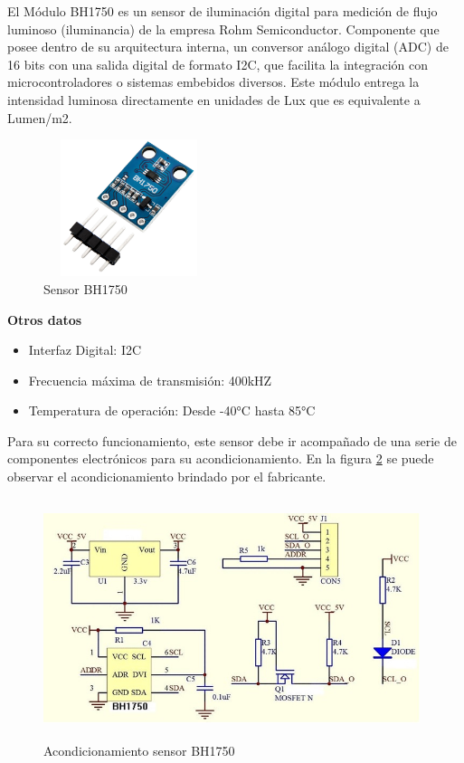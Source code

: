 El Módulo BH1750 es un sensor de iluminación digital para medición de flujo luminoso (iluminancia) de la empresa Rohm Semiconductor. Componente que posee dentro de su arquitectura interna, un conversor análogo digital (ADC) de 16 bits con una salida digital de formato I2C, que facilita la integración con microcontroladores o sistemas embebidos diversos. Este módulo entrega la intensidad luminosa directamente en unidades de Lux que es equivalente a Lumen/m2.\\

\begin{figure}[H]
    \centering
    \includegraphics[width=5cm, height=4cm]{imagenes/Sensor BH1750.jpg}
    \caption{Sensor BH1750}
    \label{imag:BH1750}
 \end{figure}

\textbf{Otros datos}

\begin{itemize}
    \item Interfaz Digital: I2C
    \item Frecuencia máxima de transmisión: 400kHZ
    \item Temperatura de operación: Desde -40°C hasta 85°C
\end{itemize}

Para su correcto funcionamiento, este sensor debe ir acompañado de una serie de componentes electrónicos para su acondicionamiento.
En la figura \ref{imag:acondicionamiento_BH1750} se puede observar el acondicionamiento brindado por el fabricante.

\begin{figure}[H]
    \centering
    \includegraphics[width=11cm, height=7cm]{imagenes/acondicionamientos sensor BH1750.jpg}
    \caption{Acondicionamiento sensor BH1750}
    \label{imag:acondicionamiento_BH1750}
\end{figure}

